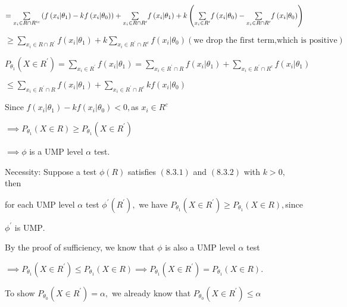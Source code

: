 \documentclass{article}
\begin{document}
$=\underset{x_{i}\in R\cap R^{\prime c}}{\sum }\left( f\left( x_{i}|\theta
_{1}\right) -kf\left( x_{i}|\theta _{0}\right) \right) +\underset{x_{i}\in
R\cap R^{\prime }}{\sum }f\left( x_{i}|\theta _{1}\right) +k\left( \underset{%
x_{i}\in R^{\prime }}{\sum }f\left( x_{i}|\theta _{0}\right) -\underset{%
x_{i}\in R\cap R^{\prime }}{\sum }f\left( x_{i}|\theta _{0}\right) \right) $

$\geq \underset{x_{i}\in R\cap R^{\prime }}{\sum }f\left( x_{i}|\theta
_{1}\right) +k\underset{x_{i}\in R^{\prime }\cap R^{c}}{\sum }f\left(
x_{i}|\theta _{0}\right) \left( \text{we drop the first term,which is
positive}\right) $

$P_{\theta _{1}}\left( X\in R^{\prime }\right) =\underset{x_{i}\in R^{\prime
}}{\sum }f\left( x_{i}|\theta _{1}\right) =\underset{x_{i}\in R^{\prime
}\cap R}{\sum }f\left( x_{i}|\theta _{1}\right) +\underset{x_{i}\in
R^{\prime }\cap R^{c}}{\sum }f\left( x_{i}|\theta _{1}\right) $

$\leq \underset{x_{i}\in R^{\prime }\cap R}{\sum }f\left( x_{i}|\theta
_{1}\right) +\underset{x_{i}\in R^{\prime }\cap R^{c}}{\sum }kf\left(
x_{i}|\theta _{0}\right) $

Since $f\left( x_{i}|\theta _{1}\right) -kf\left( x_{i}|\theta _{0}\right)
<0,$as $x_{i}\in R^{c}$

$\implies P_{\theta _{1}}\left( X\in R\right) \geq P_{\theta _{1}}\left(
X\in R^{\prime }\right) $

$\implies \phi $ is a UMP level $\alpha $ test.

Necessity: Suppose a test $\phi \left( R\right) $ satisfies $\left(
8.3.1\right) $ and $\left( 8.3.2\right) $ with $k>0,$ then

for each UMP level $\alpha $ test $\phi ^{\prime }\left( R^{\prime }\right)
, $ we have $P_{\theta _{1}}\left( X\in R^{\prime }\right) \geq P_{\theta
_{1}}\left( X\in R\right) ,$since

$\phi ^{\prime }$ is UMP$.$

By the proof of sufficiency, we know that $\phi $ is also a UMP level $%
\alpha $ test

$\implies P_{\theta _{1}}\left( X\in R^{\prime }\right) \leq P_{\theta
_{1}}\left( X\in R\right) \implies P_{\theta _{1}}\left( X\in R^{\prime
}\right) =P_{\theta _{1}}\left( X\in R\right) .$

To show $P_{\theta _{0}}\left( X\in R^{\prime }\right) =\alpha ,$ we already
know that $P_{\theta _{0}}\left( X\in R^{\prime }\right) \leq \alpha $
\end{document}
